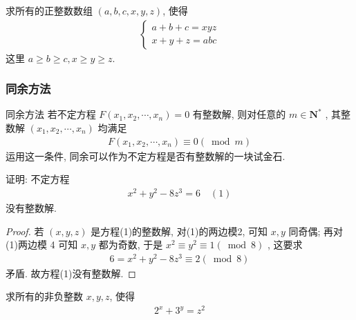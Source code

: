\documentclass[aspectratio=169]{ctexbeamer}
\theoremstyle{definition}
\begin{document}
\begin{frame}[t]
	\begin{example}
		求所有的正整数数组 $(a, b, c, x, y, z)$, 使得
		\begin{align*}
			\left\{\begin{array}{l}
				       a+b+c=x y z \\
				       x+y+z=a b c
			       \end{array}\right.
		\end{align*}
		这里 $a \geqslant b \geqslant c, x \geqslant y \geqslant z$.
	\end{example}
\end{frame}

\subsubsection*{同余方法}
\begin{frame}{同余方法}
	若不定方程 $F\left(x_{1}, x_{2}, \cdots, x_{n}\right)=0$ 有整数解, 则对任意的 $m \in \mathbf{N}^{*}$ , 其整数解 $\left(x_{1}, x_{2}, \cdots, x_{n}\right)$ 均满足
	\begin{align*}
		F\left(x_{1}, x_{2}, \cdots, x_{n}\right) \equiv 0(\bmod m)
	\end{align*}
	运用这一条件, 同余可以作为不定方程是否有整数解的一块试金石.
\end{frame}

\begin{frame}[t]
\begin{example}
	证明: 不定方程
	\begin{align*}
		x^{2}+y^{2}-8 z^{3}=6 \quad (1)
	\end{align*}
	没有整数解.
\end{example}
\pause
\begin{proof}
	若 $(x, y, z)$ 是方程(1)的整数解, 对(1)的两边模2, 可知 $x ,  y$ 同奇偶; 再对(1)两边模 4 可知 $x ,  y$ 都为奇数, 于是 $x^{2} \equiv y^{2} \equiv 1(\bmod 8)$ , 这要求
	\begin{align*}
		6=x^{2}+y^{2}-8 z^{3} \equiv 2(\bmod 8)
	\end{align*}
	矛盾. 故方程(1)没有整数解.
\end{proof}
\end{frame}

\begin{frame}[t]
\begin{example}
	求所有的非负整数 $x ,  y ,  z$, 使得
	\begin{align*}
		2^{x}+3^{y}=z^{2}
	\end{align*}
\end{example}
\end{frame}
\end{document}

